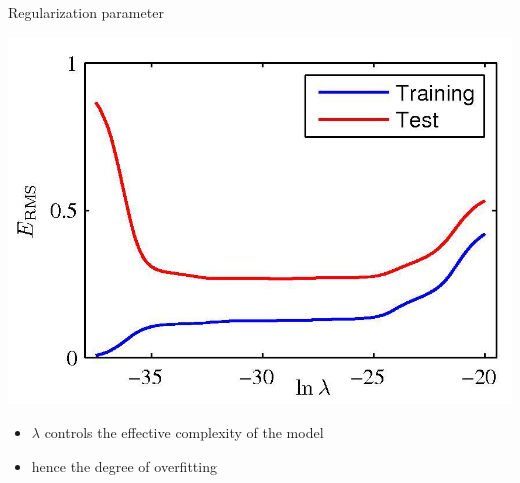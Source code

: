 \documentclass[serif, aspectratio=169]{beamer}
\begin{document}
\begin{frame}{Regularization parameter}
    \begin{minipage}{0.45\textwidth}
    \centering
    \includegraphics[width=1\textwidth]{pic/Regularization/regularization_parameter_erms.png}
    \end{minipage} %
    \begin{minipage}{0.45\textwidth}
    \begin{itemize}
        \item \( \lambda \) controls the effective complexity of the model
        \item hence the degree of overfitting
    \end{itemize}
    \end{minipage}
    \vfill
\end{frame}



\end{document}
